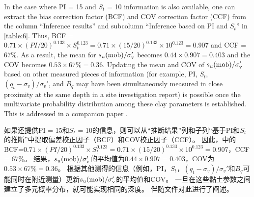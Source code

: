 \begin{paracol}{2}
    In the case where PI = 15 and $S_t$ = 10 information is also available, one can extract the bias correction factor (BCF) and COV correction factor (CCF) from the column “Inference results” and subcolumn “Inference based on PI and $S_t$” in \autoref{table:6}. Thus, BCF = $0.71\times{}(PI/20)^{0.133}\times{}S_t^{0.123} = 0.71\times{}(15/20)^{0.133}\times{}10^{0.123} = 0.907$ and CCF = 67$\%$. As a result, the mean for $s_u(\rm{mob})/\sigma_v'$ becomes $0.44\times{}0.907 = 0.403$ and the COV becomes $0.53\times{}67\%= 0.36$. Updating the mean and COV of $s_u(\rm{mob})/\sigma_v'$ based on other measured pieces of information (for example, PI, $S_t$, $(q_t-\sigma_v)/\sigma_v'$, and $B_q$ may have been simultaneously measured in close proximity at the same depth in a site investigation report) is possible once the multivariate probability distribution among these clay parameters is established. This is addressed in a companion paper \citep{Ching2014686}.
        
    \switchcolumn
    
    如果还提供PI = 15和$S_t$ = 10的信息，则可以从“推断结果”列和子列“基于PI和$S_t$的推断”中提取偏差校正因子（BCF）和COV校正因子（CCF）。 因此，中的BCF=$0.71\times{}(PI/20)^{0.133}\times{}S_t^{0.123} = 0.71\times{}(15/20)^{0.133}\times{}10^{0.123} = 0.907$，CCF = 67$\%$。 结果，$s_u(\rm{mob})/\sigma_v'$的平均值为$0.44\times{}0.907 = 0.403$，COV为$0.53\times{}67\%= 0.36$。 根据其他测得的信息（例如，PI，$S_t$，$(q_t-\sigma_v)/\sigma_v'$和$B_q$可能同时在附近测量）更新$s_u(\rm{mob})/\sigma_v'$的平均值和COV。 一旦在这些黏土参数之间建立了多元概率分布，就可能实现相同的深度。 伴随文件对此进行了阐述\citep{Ching2014686}。
        
\end{paracol}
